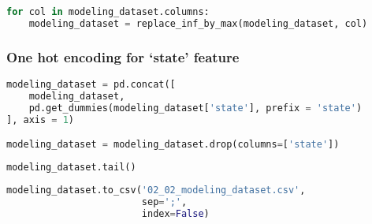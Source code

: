 \begin{lstlisting}[language=Python]
for col in modeling_dataset.columns:
    modeling_dataset = replace_inf_by_max(modeling_dataset, col)
\end{lstlisting}

\subsubsection{\texorpdfstring{One hot encoding for `state'
feature}{One hot encoding for state feature}}\label{one-hot-encoding-for-state-feature}

\begin{lstlisting}[language=Python]
modeling_dataset = pd.concat([
    modeling_dataset,
    pd.get_dummies(modeling_dataset['state'], prefix = 'state')
], axis = 1)

modeling_dataset = modeling_dataset.drop(columns=['state'])
\end{lstlisting}

\begin{lstlisting}[language=Python]
modeling_dataset.tail()
\end{lstlisting}

\begin{lstlisting}[language=Python]
modeling_dataset.to_csv('02_02_modeling_dataset.csv',
                        sep=';',
                        index=False)
\end{lstlisting}
